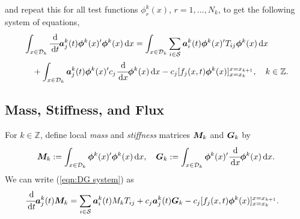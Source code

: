 and repeat this for all test functions \(\phi_r^k(x)\), \(r=1,...,N_k\), to get the following system of equations,
\begin{align}
	\begin{multlined}[t]\int_{x\in\calD_k}\cfrac{\wrt}{\wrt t} \boldsymbol a_j^k(t) \boldsymbol \phi^k(x)\tr{}\boldsymbol \phi^k(x)\wrt x = \int_{x\in\calD_k}\sum_{i\in\calS} \boldsymbol a_i^k(t) \boldsymbol \phi^k(x)\tr{}T_{ij}\boldsymbol\phi^k (x)\wrt x  
	\\{}+  \int_{x\in\calD_k}\boldsymbol a_j^k(t) \boldsymbol \phi^k(x)\tr{}c_j\cfrac{\wrt}{\wrt x}\boldsymbol\phi^k(x)\wrt x - c_j[f_j(x,t) \boldsymbol\phi^k(x)]_{x=x_k}^{x=x_{k+1}},\quad k\in\mathbb Z. \end{multlined} \label{eqn:DG system}
\end{align}

\subsection{Mass, Stiffness, and Flux}
For \(k\in\mathbb Z\), define local \textit{mass} and \textit{stiffness} matrices \(\boldsymbol M_k\) and \(\boldsymbol G_k\) by 
\[\boldsymbol M_k := \int_{x\in\mathcal{D}_k}\boldsymbol \phi^k(x)'{}\boldsymbol \phi^k(x)\, \mathrm{d} x,\quad \boldsymbol G_k := \int_{x\in\mathcal{D}_k}\boldsymbol \phi^k(x)'{}\cfrac{\, \mathrm{d}}{\, \mathrm{d} x} \boldsymbol \phi^k(x)\, \mathrm{d} x.\]
We can write (\ref{eqn:DG system}) as 
\begin{align}
	&\cfrac{\, \mathrm{d}}{\, \mathrm{d} t} \boldsymbol a_j^k(t) \boldsymbol M_k = \sum_{i\in\mathcal{S}} \boldsymbol a_i^k(t)M_kT_{ij} 
	+  c_j\boldsymbol a_j^k(t) \boldsymbol G_k - c_j[f_j(x,t)\boldsymbol\phi^k(x)]_{x=x_k}^{x=x_{k+1}}.\label{eqn:DG matrix}
\end{align}

